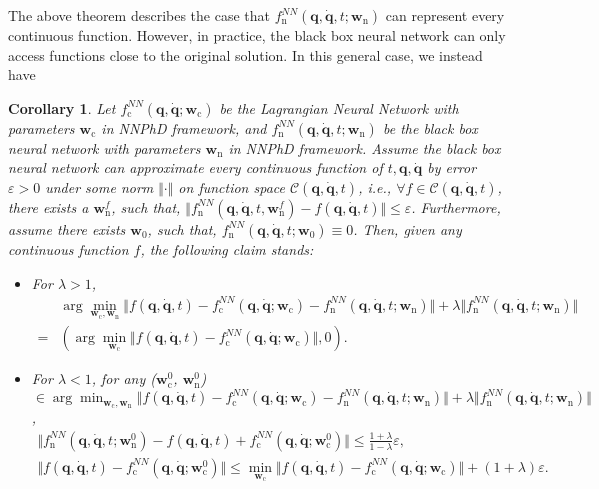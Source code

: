 \documentclass[aps,pre,reprint,superscriptaddress,nofootinbib,amsmath,amssymb]{revtex4-2}
\newcommand{\mat}[1]{\mathbf{#1}}
\newcommand{\q}{\mat{q}}
\newcommand{\qd}{\dot{\mat{q}}}
\newtheorem{corollary}{Corollary}[theorem]
\begin{document}
The above theorem describes the case that $f_{\mathrm{n}}^{NN}(\q,\qd,t;\boldsymbol{w}_{\mathrm{n}})$ can represent every continuous function. However, in practice, the black box neural network can only access functions close to the original solution. In this general case, we instead have
\begin{corollary}\label{cor:theorem1_extension}
	Let $f_{\mathrm{c}}^{NN}(\q,\qd;\boldsymbol{w}_{\mathrm{c}})$ be the Lagrangian Neural Network with parameters $\boldsymbol{w}_{\mathrm{c}}$ in NNPhD
	framework, and $f_{\mathrm{n}}^{NN}(\q,\qd,t;\boldsymbol{w}_{\mathrm{n}})$ be the black box neural network with parameters $\boldsymbol{w}_{\mathrm{n}}$ in NNPhD framework. Assume the black box neural network can approximate every continuous function of $t,\q,\qd$ by error $\varepsilon>0$ under some norm $\Vert \cdot\Vert$ on function space $\mathcal{C}(\q,\qd,t)$, i.e., $\forall f\in \mathcal{C}(\q,\qd,t)$, there exists a $\boldsymbol{w}_{\mathrm{n}}^f$, such that, $\Vert f_{\mathrm{n}}^{NN}(\q,\qd,t,\boldsymbol{w}_{\mathrm{n}}^f)-f(\q,\qd,t) \Vert\le \varepsilon$. Furthermore, assume there exists $\boldsymbol{w}_0$, such that,  $f_{\mathrm{n}}^{NN}(\q,\qd,t;\boldsymbol{w}_0)\equiv 0$.
	Then, given any continuous function $f$, the following claim stands:
	\begin{itemize}
		\item For $\lambda>1$, 
		\begin{align*}
		&\arg\min_{\boldsymbol{w}_{\mathrm{c}},\boldsymbol{w}_{\mathrm{n}}} \Vert f(\q,\qd,t)-f_{\mathrm{c}}^{NN}(\q,\qd;\boldsymbol{w}_{\mathrm{c}})-f_{\mathrm{n}}^{NN}(\q,\qd,t;\boldsymbol{w}_{\mathrm{n}})\Vert +\lambda \Vert f_{\mathrm{n}}^{NN}(\q,\qd,t;\boldsymbol{w}_{\mathrm{n}})\Vert
			\\
		=&\left(\arg\min_{\boldsymbol{w}_{\mathrm{c}}} \Vert f(\q,\qd,t)-f_{\mathrm{c}}^{NN}(\q,\qd;\boldsymbol{w}_{\mathrm{c}})\Vert,0\right). 
		\end{align*}
		\item For $\lambda<1$, for any ($\boldsymbol{w}_{\mathrm{c}}^0$, $\boldsymbol{w}_{\mathrm{n}}^0$) $\in \arg\min_{\boldsymbol{w}_{\mathrm{c}},\boldsymbol{w}_{\mathrm{n}}} \Vert f(\q,\qd,t)-f_{\mathrm{c}}^{NN}(\q,\qd;\boldsymbol{w}_{\mathrm{c}})-f_{\mathrm{n}}^{NN}(\q,\qd,t;\boldsymbol{w}_{\mathrm{n}})\Vert +\lambda \Vert f_{\mathrm{n}}^{NN}(\q,\qd,t;\boldsymbol{w}_{\mathrm{n}})\Vert$, 
		\begin{gather}
			\label{eq:n_NN_approximating}
			\Vert f_{\mathrm{n}}^{NN}(\q,\qd,t;\boldsymbol{w}^0_{\mathrm{n}})-f(\q,\qd,t)+f_{\mathrm{c}}^{NN}(\q,\qd;\boldsymbol{w}^0_{\mathrm{c}})\Vert\le \frac{1+\lambda}{1-\lambda} \varepsilon,
			\\
			\label{eq:c_NN_approximating}
			\Vert f(\q,\qd,t)-f_{\mathrm{c}}^{NN}(\q,\qd;\boldsymbol{w}^0_{\mathrm{c}})\Vert \le \min_{\boldsymbol{w}_{\mathrm{c}}} \Vert f(\q,\qd,t)-f_{\mathrm{c}}^{NN}(\q,\qd;\boldsymbol{w}_{\mathrm{c}})\Vert+(1+\lambda)\varepsilon . 
		\end{gather}
	\end{itemize}
\end{corollary}
\end{document}
